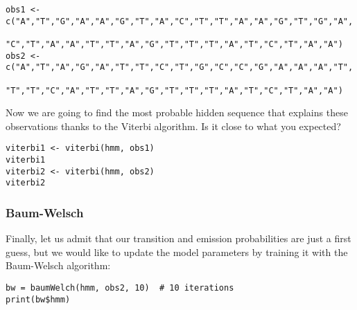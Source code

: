 \documentclass[a4paper,11pt]{article}
\begin{document}
\begin{verbatim}
obs1 <- c("A","T","G","A","A","G","T","A","C","T","T","A","A","G","T","G","A",
          "C","T","A","A","T","T","A","G","T","T","T","A","T","C","T","A","A")
obs2 <- c("A","T","A","G","A","T","T","C","T","G","C","C","G","A","A","A","T",
          "T","T","C","A","T","T","A","G","T","T","T","A","T","C","T","A","A")
\end{verbatim}

Now we are going to find the most probable hidden sequence that explains these observations thanks to the Viterbi algorithm. Is it close to what you expected?

\begin{verbatim}
viterbi1 <- viterbi(hmm, obs1)
viterbi1
viterbi2 <- viterbi(hmm, obs2)
viterbi2
\end{verbatim}

\subsubsection{Baum-Welsch}

Finally, let us admit that our transition and emission probabilities are just a first guess, but we would like to update the model parameters by training it with the Baum-Welsch algorithm:

\begin{verbatim}
bw = baumWelch(hmm, obs2, 10)  # 10 iterations
print(bw$hmm)
\end{verbatim}
\end{document}
